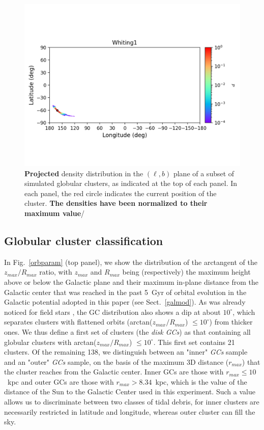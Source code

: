 \begin{figure}
        \includegraphics[clip=true, trim = 0mm 20mm 0mm 10mm, width=1\columnwidth]{images/error_plots_Whiting1.png}
        \caption[]{\textbf{Projected} density distribution in the $(\ell, b)$ plane of a subset of simulated globular clusters, as indicated at the top of each panel. In each panel, the red circle indicates the current position of the cluster. \textbf{The densities have been normalized to their maximum value}/}\label{stream20}
        \end{figure}

    \subsection{Globular cluster classification}\label{class}
        In Fig.~\ref{orbparam} (top panel), we show the distribution of the arctangent of the $z_{max}/R_{max}$ ratio, with $z_{max}$ and $R_{max}$ being (respectively) the maximum height above or below the Galactic plane and their maximum in-plane distance from the Galactic center that was reached in the past 5~Gyr of orbital evolution in the Galactic potential adopted in this paper (see Sect.~\ref{galmod}). As was already noticed for field stars \citep[see][]{2018ApJ...863..113H}, the GC distribution also shows a dip at about $10^\circ$, which separates clusters with flattened orbits (arctan($z_{max}/R_{max}$) $\le 10^\circ$) from thicker ones. We thus define a first set of clusters (the \emph{disk GCs}) as that containing all globular clusters with arctan($z_{max}/R_{max}$) $\le 10^\circ$. This first set contains 21 clusters. Of the remaining 138, we distinguish between  an "inner" \emph{ GCs} sample and an "outer" \emph{ GCs} sample, on the basis of the maximum 3D distance ($r_{max}$) that the cluster reaches from the Galactic center. Inner GCs are those with $r_{max} \le 10$~kpc and outer GCs are those with $r_{max} > 8.34$~kpc, which is the value of the distance of the Sun to the Galactic Center used in this experiment. Such a value allows us to discriminate between two classes of tidal debris, for inner clusters are necessarily restricted in latitude and longitude, whereas outer cluster can fill the sky. 

